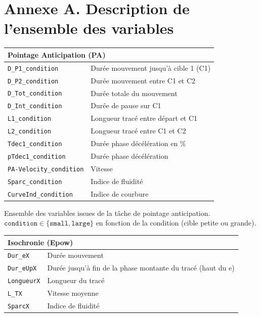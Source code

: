 \section*{Annexe A. Description de l'ensemble des variables}
 \label{table:annexe_description_var}

\begin{table}[h]
	\centering
	\begin{tabular}{p{}|p{}}
		\multicolumn{2}{l}{\textbf{Pointage Anticipation (PA)}} \\ \hline
		\texttt{D\_P1\_condition} & Durée mouvement jusqu'à cible 1 (C1) \\
		\texttt{D\_P2\_condition} & Durée mouvement entre C1 et C2 \\
		\texttt{D\_Tot\_condition} & Durée totale du mouvement \\
		\texttt{D\_Int\_condition} & Durée de pause sur C1 \\
		\texttt{L1\_condition} & Longueur tracé entre départ et C1 \\
		\texttt{L2\_condition} & Longueur tracé entre C1 et C2 \\
		\texttt{Tdec1\_condition} & Durée phase décélération en \% \\
		\texttt{pTdec1\_condition} & Durée phase décélération \\
		\texttt{PA-Velocity\_condition} & Vitesse \\
		\texttt{Sparc\_condition} & Indice de fluidité \\
		\texttt{CurveInd\_condition} & Indice de courbure \\
	\end{tabular}
\end{table}

Ensemble des variables issues de la tâche de pointage anticipation. $\texttt{condition} \in \{\texttt{small} , \texttt{large}\}$ en fonction de la condition (cible petite ou grande).

\medskip

\begin{table}[h]
	\centering
	\begin{tabular}{p{}|p{}}
		\multicolumn{2}{l}{\textbf{Isochronie (Epow)}} \\ \hline
		\texttt{Dur\_eX} & Durée mouvement \\
		\texttt{Dur\_eUpX} & Durée jusqu'à fin de la phase montante du tracé (haut du e) \\
		\texttt{LongueurX} & Longueur du tracé \\
		\texttt{L\_TX} & Vitesse moyenne \\
		\texttt{SparcX} & Indice de fluidité \\
	\end{tabular}
\end{table}

